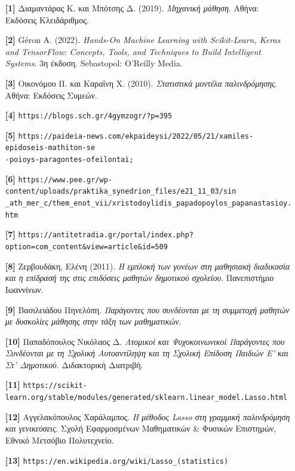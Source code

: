 \documentclass[12pt]{article}
\begin{document}
\begin{itemize}[label={}, leftmargin=2.8em, itemsep=1em, labelsep=0pt, itemindent=0pt, align=left]

\item [\textbf{[1]}] Διαμαντάρας Κ. και Μπότσης Δ. (2019). \textit{Μηχανική μάθηση}. Αθήνα: Εκδόσεις Κλειδάριθμος.

\item [\textbf{[2]}] Géron A. (2022). \textit{Hands-On Machine Learning with Scikit-Learn, Keras and TensorFlow: Concepts, Tools, and Techniques to Build Intelligent Systems}. 3η έκδοση. Sebastopol: O’Reilly Media.

\item [\textbf{[3]}] Οικονόμου Π. και Καραΐνη Χ. (2010). \textit{Στατιστικά μοντέλα παλινδρόμησης}. Αθήνα: Εκδόσεις Συμεών.

\item [\textbf{[4]}] \texttt{https://blogs.sch.gr/4gymzogr/?p=395}

\item [\textbf{[5]}] \texttt{https://paideia-news.com/ekpaideysi/2022/05/21/xamiles-epidoseis-mathiton-se \\
-poioys-paragontes-ofeilontai;}

\item [\textbf{[6]}] \texttt{https://www.pee.gr/wp-content/uploads/praktika\_synedrion\_files/e21\_11\_03/sin \\
\_ath\_mer\_c/them\_enot\_vii/xristodoylidis\_papadopoylos\_papanastasioy.htm}

\item [\textbf{[7]}] \texttt{https://antitetradia.gr/portal/index.php?option=com\_content\&view=article\&id=509}

\item [\textbf{[8]}] Ζερβουδάκη, Ελένη (2011). \textit{Η εμπλοκή των γονέων στη μαθησιακή διαδικασία και η επίδρασή της στις επιδόσεις μαθητών δημοτικού σχολείου}. Πανεπιστήμιο Ιωαννίνων.

\item [\textbf{[9]}] Βασιλειάδου Πηνελόπη. \textit{Παράγοντες που συνδέονται με τη συμμετοχή μαθητών με δυσκολίες μάθησης στην τάξη των μαθηματικών}.

\item [\textbf{[10]}] Παπαδόπουλος Νικόλαος Δ. \textit{Ατομικοί και Ψυχοκοινωνικοί Παράγοντες που Συνδέονται με τη Σχολική Αυτοαντίληψη και τη Σχολική Επίδοση Παιδιών Ε’ και Στ’ Δημοτικού}. Διδακτορική Διατριβή.

\item [\textbf{[11]}] \texttt{https://scikit-learn.org/stable/modules/generated/sklearn.linear\_model.Lasso.html}

\item [\textbf{[12]}] Αγγελακόπουλος Χαράλαμπος. \textit{Η μέθοδος Lasso στη γραμμική παλινδρόμηση και γενικεύσεις}. Σχολή Εφαρμοσμένων Μαθηματικών \& Φυσικών Επιστημών, Εθνικό Μετσόβιο Πολυτεχνείο.

\item [\textbf{[13]}] \texttt{https://en.wikipedia.org/wiki/Lasso\_\texttt{(}statistics\texttt{)}}


\end{itemize}
\end{document}
